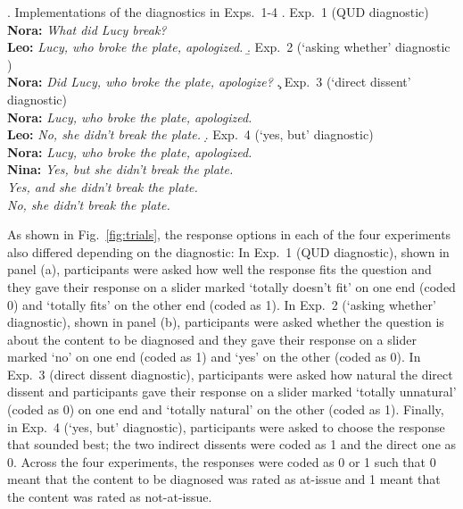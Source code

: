 \documentclass[times,linguex]{glossa}
\begin{document}
\ex.\label{diag} Implementations of the diagnostics in Exps.~1-4
\a.\label{diag.a} Exp.~1 (QUD diagnostic)
\\ {\bf Nora:} \emph{What did Lucy break?}
\\ {\bf Leo:} \emph{Lucy, who broke the plate, apologized.}
\b.\label{diag.b} Exp.~2 (`asking whether' diagnostic )
\\ {\bf Nora:} \emph{Did Lucy, who broke the plate, apologize?}
\c.\label{diag.c} Exp.~3 (`direct dissent' diagnostic)
\\ {\bf Nora:} \emph{Lucy, who broke the plate, apologized.}
\\ {\bf Leo:} \emph{No, she didn't break the plate.}
\d.\label{diag.d} Exp.~4 (`yes, but' diagnostic)
\\ {\bf Nora:} \emph{Lucy, who broke the plate, apologized.}
\\ {\bf Nina:} \emph{Yes, but she didn't break the plate.}
\\ \hspace*{1cm} \emph{Yes, and she didn't break the plate.}
\\ \hspace*{1cm} \emph{No, she didn't break the plate.}

As shown in Fig.~\ref{fig:trials}, the response options in each of the four experiments also differed depending on the diagnostic: In Exp.~1 (QUD diagnostic), shown in panel (a), participants were asked how well the response fits the question and they gave their response on a slider marked `totally doesn't fit' on one end (coded 0) and `totally fits' on the other end (coded as 1). In Exp.~2 (`asking whether' diagnostic), shown in panel (b), participants were asked whether the question is about the content to be diagnosed and they gave their response on a slider marked `no' on one end (coded as 1) and `yes' on the other (coded as 0). In Exp.~3 (direct dissent diagnostic), participants were asked how natural the direct dissent and participants gave their response on a slider marked `totally unnatural' (coded as 0) on one end and `totally natural' on the other (coded as 1). Finally, in Exp.~4 (`yes, but' diagnostic), participants were asked to choose the response that sounded best; the two indirect dissents were coded as 1 and the direct one as 0. Across the four experiments, the responses were coded as 0 or 1 such that 0 meant that the content to be diagnosed was rated as at-issue and 1 meant that the content was rated as not-at-issue.
\end{document}
